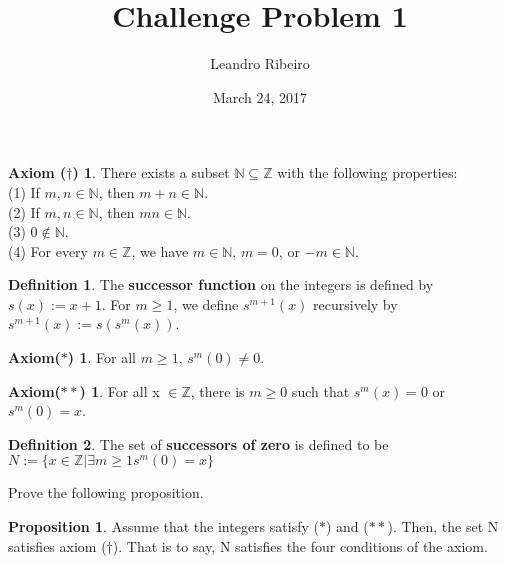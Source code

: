 \documentclass[12pt]{amsart}
\newcommand{\N}{\mathbb{N}}
\newcommand{\Z}{\mathbb{Z}}
\begin{document}
\title{Challenge Problem 1}
\date{March 24, 2017}
\author{Leandro Ribeiro}

\maketitle

\theoremstyle{definition}
\newtheorem*{axD}{Axiom ($\dagger$)}
\begin{axD}
	There exists a subset $\N \subseteq \Z$ with the following properties:
	\\\indent(1) If $m,n \in \N$, then $m + n \in \N$.
	\\\indent(2) If $m,n \in \N$, then $mn \in \N$.
	\\\indent(3) $0 \notin \N$.
	\\\indent(4) For every $m \in \Z$, we have $m \in \N$, $m = 0$, or $- m \in \N$.
\end{axD}

\newtheorem*{definition}{Definition}
\begin{definition}
The \textbf{successor function} on the integers is defined by $s(x) :=
x + 1$. For $m \geq 1$, we define $s^{m+1}(x)$ recursively by $s^{m+1}(x) := s(s^{m}(x))$.
\end{definition}

\newtheorem*{ax1}{Axiom($\ast$)}
\begin{ax1}
For all $m \geq 1$, $s^{m}(0) \neq 0$.\vspace{2mm}
\end{ax1}

\newtheorem*{ax2}{Axiom($\ast\ast$)}
\begin{ax2}
	For all x $\in \Z$, there is $m \geq 0$ such that $s^m(x) = 0$ or $s^m(0) = x$.
\end{ax2}
\begin{definition}
	The set of \textbf{successors of zero} is defined to be \center$N := \{x \in \Z | \exists m \geq 1 s^m(0) = x\}$\vspace*{1.5mm}
\end{definition}
\noindent\hspace*{5mm} Prove the following proposition.\vspace*{1.5mm}

\theoremstyle{proposition}
\newtheorem*{proposition}{Proposition}
\begin{proposition}
	Assume that the integers satisfy \textnormal{($\ast$)} and \textnormal{($\ast\ast$)}. Then, the set
	N satisfies axiom \textnormal{($\dagger$)}. That is to say, N satisfies the four conditions of the
axiom.
\end{proposition}
\end{document}
